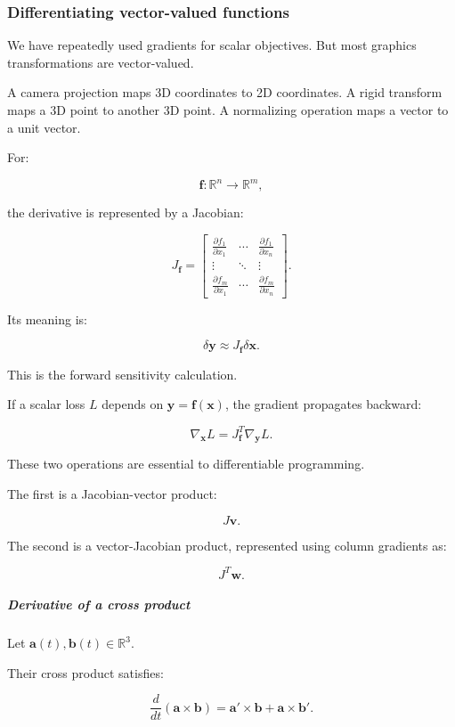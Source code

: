 \subsubsection{Differentiating vector-valued functions}\label{differentiating-vector-valued-functions}

We have repeatedly used gradients for scalar objectives. But most graphics transformations are vector-valued.

A camera projection maps 3D coordinates to 2D coordinates. A rigid transform maps a 3D point to another 3D point. A normalizing operation maps a vector to a unit vector.

For:

\[
\mathbf f:\mathbb R^n\rightarrow\mathbb R^m,
\]

the derivative is represented by a Jacobian:

\[
\boxed{ J_{\mathbf f}= \begin{bmatrix} \frac{\partial f_1}{\partial x_1}&\cdots&\frac{\partial f_1}{\partial x_n}\\ \vdots&\ddots&\vdots\\ \frac{\partial f_m}{\partial x_1}&\cdots&\frac{\partial f_m}{\partial x_n} \end{bmatrix} }.
\]

Its meaning is:

\[
\delta\mathbf y\approx J_{\mathbf f}\delta\mathbf x.
\]

This is the forward sensitivity calculation.

If a scalar loss \(L\) depends on \(\mathbf y=\mathbf f(\mathbf x)\), the gradient propagates backward:

\[
\boxed{ \nabla_{\mathbf x}L = J_{\mathbf f}^T\nabla_{\mathbf y}L }.
\]

These two operations are essential to differentiable programming.

The first is a Jacobian-vector product:

\[
J\mathbf v.
\]

The second is a vector-Jacobian product, represented using column gradients as:

\[
J^T\mathbf w.
\]

\subparagraph{Derivative of a cross product}\label{derivative-of-a-cross-product}

Let \(\mathbf a(t),\mathbf b(t)\in\mathbb R^3\).

Their cross product satisfies:

\[
\frac d{dt}(\mathbf a\times\mathbf b) = \mathbf a'\times\mathbf b+ \mathbf a\times\mathbf b'.
\]

